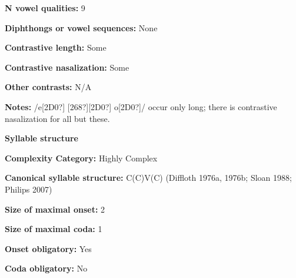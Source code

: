 \begin{styleBody}
\textbf{N vowel qualities:} 9
\end{styleBody}

\begin{styleBody}
\textbf{Diphthongs or vowel sequences:} None
\end{styleBody}

\begin{styleBody}
\textbf{Contrastive length:} Some
\end{styleBody}

\begin{styleBody}
\textbf{Contrastive nasalization:} Some
\end{styleBody}

\begin{styleBody}
\textbf{Other contrasts:} N/A
\end{styleBody}

\begin{styleBody}
\textbf{Notes:} /e[2D0?] [268?][2D0?] o[2D0?]/ occur only long; there is contrastive nasalization for all but these.
\end{styleBody}

\begin{styleBody}
\textbf{Syllable structure}
\end{styleBody}

\begin{styleBody}
\textbf{Complexity Category: }Highly Complex 
\end{styleBody}

\begin{styleBody}
\textbf{Canonical syllable structure:} C(C)V(C)\textbf{ }(Diffloth 1976a, 1976b; Sloan 1988; Philips 2007)
\end{styleBody}

\begin{styleBody}
\textbf{Size of maximal onset:} 2
\end{styleBody}

\begin{styleBody}
\textbf{Size of maximal coda:} 1
\end{styleBody}

\begin{styleBody}
\textbf{Onset obligatory:} Yes
\end{styleBody}

\begin{styleBody}
\textbf{Coda obligatory:} No
\end{styleBody}

